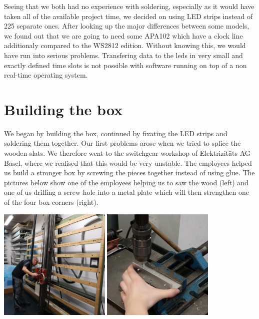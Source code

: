 \documentclass[a4paper,12pt]{article}
\begin{document}
 Seeing that we both had no experience with soldering, especially as it would have taken all of the available project time, we decided on using LED strips instead of 225 separate ones.
 After looking up the major differences between some models, we found out that we are going to need some APA102 which have a clock line additionaly compared to the WS2812 edition.
 Without knowing this, we would have run into serious problems. Transfering data to the leds in very small and exactly defined time slots is not possible with software running on top of a non real-time operating system.

\section{Building the box}
 We began by building the box, continued by fixating the LED strips and soldering them together.
 Our first problems arose when we tried to splice the wooden slats.
 We therefore went to the switchgear workshop of Elektrizitäts AG Basel, where we realised that this would be very unstable.
 The employees helped us build a stronger box by screwing the pieces together instead of using glue.
 The pictures below show one of the employees helping us to saw the wood (left) and one of us drilling a screw hole into a metal plate which will then strengthen one of the four box corners (right).
 
\vspace{1cm}

{ \centering
  \includegraphics[width = 0.4\textwidth]{brice.jpg}
  \space{   }
  \includegraphics[width = 0.4\textwidth]{bohren.jpg}
  \\}
 \vspace{1cm}
 
\end{document}
